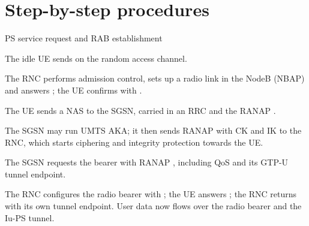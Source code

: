 \documentclass[11pt,a4paper]{article}
\begin{document}
\begin{acnfigure}
  \caption{UMTS architecture with the UTRAN, the circuit-switched and the packet-switched
  core domains. Dashed: MAP signalling to the HLR.}
  \label{fig:umts}
\end{acnfigure}

\begin{acnfigure}
  \caption{OVSF code tree. Assigning $(1,1,1,1)$ blocks its parent $(1,1)$ and the root, but
  its sibling $(1,1,-1,-1)$ remains usable; all codes of one SF are mutually orthogonal.}
  \label{fig:ovsf}
\end{acnfigure}

\section{Step-by-step procedures}
\begin{procedurebox}{PS service request and RAB establishment}\label{proc:rab}
\begin{steps}
  \item The idle UE sends  on the random access channel.
  \item The RNC performs admission control, sets up a radio link in the NodeB (NBAP) and
        answers ; the UE confirms with .
  \item The UE sends a NAS  to the SGSN, carried in an RRC
         and the RANAP .
  \item The SGSN may run UMTS AKA; it then sends RANAP  with CK and
        IK to the RNC, which starts ciphering and integrity protection towards the UE.
  \item The SGSN requests the bearer with RANAP , including QoS and its
        GTP-U tunnel endpoint.
  \item The RNC configures the radio bearer with ; the UE answers
        ; the RNC returns  with its own
        tunnel endpoint. User data now flows over the radio bearer and the Iu-PS tunnel.
\end{steps}
\end{procedurebox}
\end{document}
